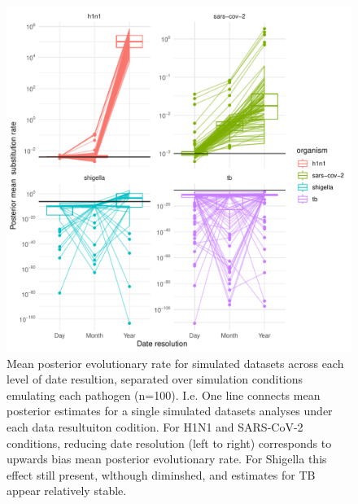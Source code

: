 \documentclass{article}
\begin{document}
\begin{spacing}{1.5}
\begin{figure}[h]
\centering
\includegraphics[width = 1\linewidth]{sim_clock_trajectory}
\caption{Mean posterior evolutionary rate for simulated datasets across each level of date resultion, separated over simulation conditions emulating each pathogen (n=100). I.e. One line connects mean posterior estimates for a single simulated datasets analyses under each data resultuiton codition. For H1N1 and SARS-CoV-2 conditions, reducing date resolution (left to right) corresponds to upwards bias mean posterior evolutionary rate. For Shigella this effect still present, wlthough diminshed, and estimates for TB appear relatively stable.}
\label{simClock}
\end{figure}


\end{spacing}
\end{document}

